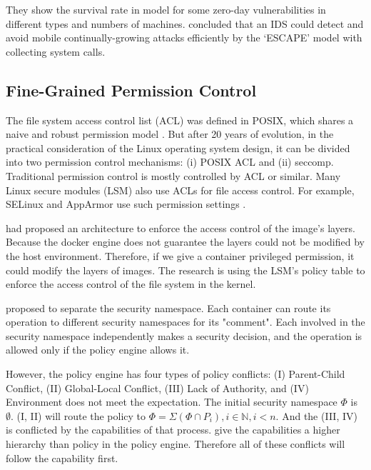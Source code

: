 They show the survival rate in \textcite{10.1007/978-3-319-24858-5_8} model for some
zero-day vulnerabilities in different types and numbers of machines.
\textcite{7809699,7796855} concluded that an IDS could detect and avoid mobile continually-growing
attacks efficiently by the `ESCAPE' model with collecting system calls.

\subsection{Fine-Grained Permission Control}

The file system access control list (ACL) was defined in POSIX, which shares a naive and robust
permission model \cite{Grnbacher2003POSIXAC, 10.5555/3026877.3026930}. But after 20 years of
evolution, in the practical consideration of the Linux operating system design, it can be divided
into two permission control mechanisms: (\Rn{1}) POSIX ACL and (\Rn{2}) seccomp. Traditional
permission control is mostly controlled by ACL or similar. Many Linux secure modules (LSM) also
use ACLs for file access control\cite{Smalley2003ImplementingSA}. For example, SELinux and AppArmor
use such permission settings \cite{9184912, 217614, x11-SELinux, quteprints30563}.

\textcite{9184912} had proposed an architecture to enforce the access
control of the image's layers. Because the docker engine does not guarantee the layers could
not be modified by the host environment. Therefore, if we give a container privileged
permission, it could modify the layers of images. The research \cite{9184912} is using
the LSM's policy table to enforce the access control of the file system in the kernel.

\textcite{217614} proposed to separate the security namespace. Each container
can route its operation to different security namespaces for its "comment". Each
involved in the security namespace independently makes a security decision, and the
operation is allowed only if the policy engine allows it.

However, the policy engine has four types of policy conflicts: (\RN{1}) Parent-Child Conflict,
(\RN{2}) Global-Local Conflict, (\RN{3}) Lack of Authority, and  (\RN{4}) Environment does not
meet the expectation. The initial security namespace $\Phi$ is $\emptyset$. (\RN{1},
\RN{2}) will route the policy to $\Phi = \Sigma (\Phi \cap P_i), i \in \mathbb{N}, i < n$.
And the (\RN{3}, \RN{4}) is conflicted by the capabilities of that process. \textcite{217614}
give the capabilities a higher hierarchy than policy in the policy engine. Therefore
all of these conflicts will follow the capability first.

